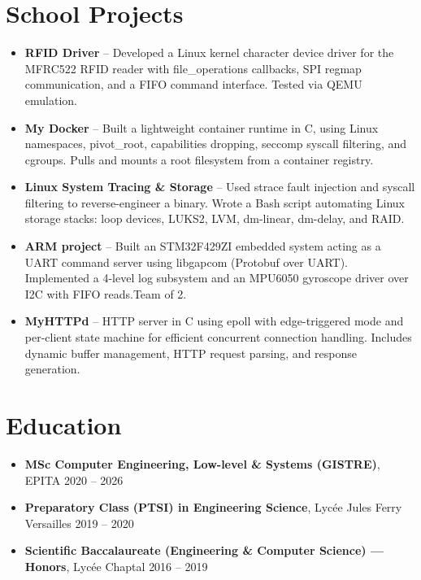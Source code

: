 \documentclass[9pt,a4paper]{article}
\begin{document}
\section*{School Projects}
\begin{tcolorbox}[mybox]
\begin{itemize}
\item \textbf{RFID Driver} -- Developed a Linux kernel character device driver for the MFRC522 RFID reader with file\_operations callbacks, SPI regmap communication, and a FIFO command interface. Tested via QEMU emulation.

\item \textbf{My Docker} -- Built a lightweight container runtime in C, using Linux namespaces, pivot\_root, capabilities dropping, seccomp syscall filtering, and cgroups. Pulls and mounts a root filesystem from a container registry.

\item \textbf{Linux System Tracing \& Storage} -- Used strace fault injection and syscall filtering to reverse-engineer a binary. Wrote a Bash script automating Linux storage stacks: loop devices, LUKS2, LVM, dm-linear, dm-delay, and RAID.

\item \textbf{ARM project} -- Built an STM32F429ZI embedded system acting as a UART command server using libgapcom (Protobuf over UART). Implemented a 4-level log subsystem and an MPU6050 gyroscope driver over I2C with FIFO reads.Team of 2.

\item \textbf{MyHTTPd} -- HTTP server in C using epoll with edge-triggered mode and per-client state machine for efficient concurrent connection handling. Includes dynamic buffer management, HTTP request parsing, and response generation.
\end{itemize}
\end{tcolorbox}


\section*{Education}
\begin{tcolorbox}[mybox]
\begin{itemize}
\item \textbf{MSc Computer Engineering, Low-level \& Systems (GISTRE)}, EPITA {\small{\hfill 2020 – 2026}}

\item \textbf{Preparatory Class (PTSI) in Engineering Science}, Lycée Jules Ferry Versailles {\small{\hfill 2019 – 2020}}

\item \textbf{Scientific Baccalaureate (Engineering \& Computer Science) — Honors}, Lycée Chaptal {\small{\hfill 2016 – 2019}}
\end{itemize}
\end{tcolorbox}
\end{document}
